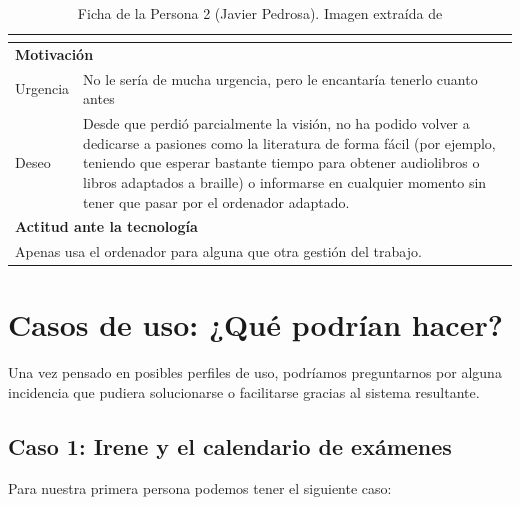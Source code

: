 \begin{table}[H]
\begin{tabular}{|l|l|l|}
{		}                \\ 
		\hline
		\multicolumn{3}{|l|}{{\cellcolor{lightblue}}\textbf{Motivación}}                   \\ 
		\hline
		Urgencia     & \multicolumn{2}{l|}{
			\begin{minipage}[t]{0.7\textwidth}
				No le sería de mucha urgencia, pero le encantaría tenerlo cuanto antes
			\end{minipage}
		}                \\ 
		\hline
		Deseo        & \multicolumn{2}{l|}{
			\begin{minipage}[t]{0.7\textwidth}
				Desde que perdió parcialmente la visión, no ha podido volver a dedicarse a pasiones como la literatura de forma fácil (por ejemplo, teniendo que esperar bastante tiempo para obtener audiolibros o libros adaptados a braille) o informarse en cualquier momento sin tener que pasar por el ordenador adaptado.
			\end{minipage}
		}                \\ 
		\hline
		\multicolumn{3}{|l|}{{\cellcolor{lightblue}}\textbf{Actitud ante la tecnología}}    \\ 
		\hline
		\multicolumn{3}{|l|}{
			\begin{minipage}[t]{\textwidth}
				Apenas usa el ordenador para alguna que otra gestión del trabajo.
			\end{minipage}
		}                              \\
		\hline
	\end{tabular}
	\caption[Ficha Persona 2]{Ficha de la Persona 2 (Javier Pedrosa). Imagen extraída de \cite{thispersondoesnotexist}}
\end{table}

\newpage

\section{Casos de uso: ¿Qué podrían hacer?}

Una vez pensado en posibles perfiles de uso, podríamos preguntarnos por alguna incidencia que pudiera solucionarse o facilitarse gracias al sistema resultante.

\subsection{Caso 1: Irene y el calendario de exámenes}

Para nuestra primera persona podemos tener el siguiente caso:

